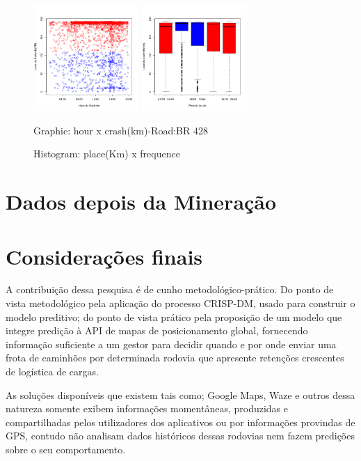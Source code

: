 \documentclass[conference,compsoc]{IEEEtran}
\begin{document}
\begin{figure}[ht]
\begin{center}
     \includegraphics[height=4.0cm]{graficos/br428_1.png}
     \includegraphics[height=4.0cm]{graficos/br428_2.png}
     \tiny { \caption{Graphic: hour x crash(km)-Road:BR 428}}
     \tiny { \caption{Histogram: place(Km) x frequence}}
\end{center}
\end{figure}


\section{Dados depois da Mineração}

\pagebreak


\section{Considerações finais}

A contribuição dessa pesquisa é de cunho metodológico-prático.
Do ponto de vista metodológico pela aplicação do processo CRISP-DM, usado para construir o modelo preditivo; do ponto de vista prático 
pela proposição de um modelo que integre predição à API de mapas de posicionamento global, fornecendo informação suficiente a um gestor para decidir quando 
e por onde enviar uma frota de caminhões por determinada rodovia que apresente retenções crescentes de logística de cargas. 

As soluções disponíveis que existem tais como; Google Maps, Waze e outros dessa natureza somente exibem informações momentâneas, produzidas e compartilhadas pelos utilizadores 
dos aplicativos ou por informações provindas de GPS, contudo não analisam dados históricos dessas rodovias nem fazem predições sobre o seu comportamento.
\end{document}
